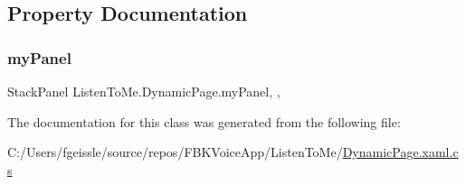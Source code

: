 \subsection{Property Documentation}
\mbox{\label{class_listen_to_me_1_1_dynamic_page_a187c4aba2636c3956cf023f1dc3f86ec}} 
\subsubsection{\texorpdfstring{my\+Panel}{myPanel}}
{\footnotesize\ttfamily Stack\+Panel Listen\+To\+Me.\+Dynamic\+Page.\+my\+Panel\hspace{0.3cm}{\ttfamily [get]}, {\ttfamily [set]}, {\ttfamily [private]}}



The documentation for this class was generated from the following file\+:\begin{DoxyCompactItemize}
\item 
C\+:/\+Users/fgeissle/source/repos/\+F\+B\+K\+Voice\+App/\+Listen\+To\+Me/\mbox{\hyperlink{_dynamic_page_8xaml_8cs}{Dynamic\+Page.\+xaml.\+cs}}\end{DoxyCompactItemize}
